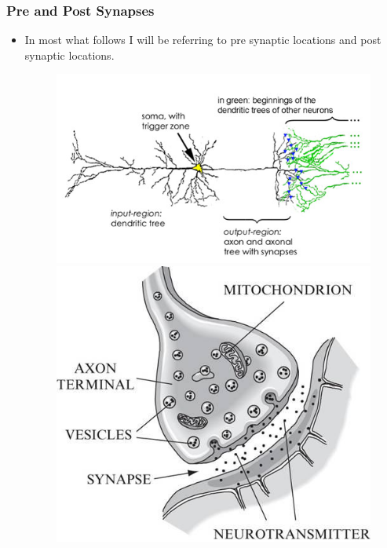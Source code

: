 \documentclass{beamer}
\begin{document}
		


\begin{frame}
\frametitle{Pre and Post Synapses}%
\begin{itemize}

\vfill\item In most what follows I will be referring to pre synaptic locations and post synaptic locations.
\vfill

\begin{figure}
\centering
\begin{minipage}{.45\textwidth}
\centering
\includegraphics[scale=1.3]{ios.jpg}
\end{minipage}\hfill\hfill\hfill
\begin{minipage}{.45\textwidth}
\centering
\includegraphics[scale=0.35]{anatomy2}


\end{minipage}
\end{figure}
\end{itemize}
\end{frame}
\end{document}
